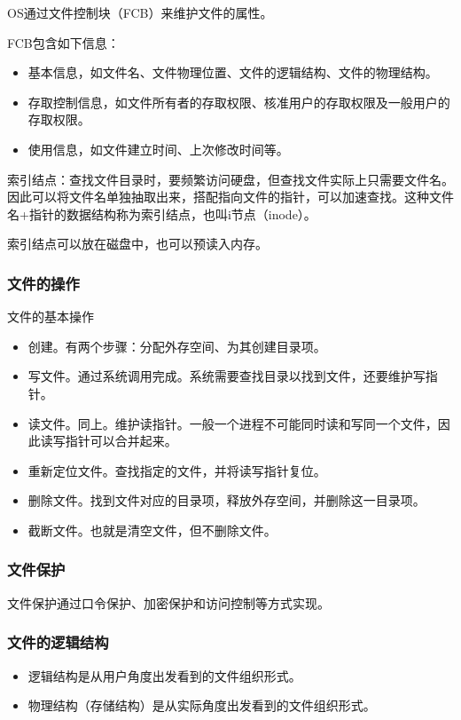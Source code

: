 \documentclass[12pt, a4paper, oneside]{ctexart}
\begin{document}
OS通过文件控制块（FCB）来维护文件的属性。

FCB包含如下信息：
\begin{itemize}
  \item 基本信息，如文件名、文件物理位置、文件的逻辑结构、文件的物理结构。
  \item 存取控制信息，如文件所有者的存取权限、核准用户的存取权限及一般用户的存取权限。
  \item 使用信息，如文件建立时间、上次修改时间等。
\end{itemize}

索引结点：查找文件目录时，要频繁访问硬盘，但查找文件实际上只需要文件名。因此可以将文件名单独抽取出来，搭配指向文件的指针，可以加速查找。这种文件名+指针的数据结构称为索引结点，也叫i节点（inode）。

索引结点可以放在磁盘中，也可以预读入内存。

\subsubsection{文件的操作}

文件的基本操作
\begin{itemize}
  \item 创建。有两个步骤：分配外存空间、为其创建目录项。
  \item 写文件。通过系统调用完成。系统需要查找目录以找到文件，还要维护写指针。
  \item 读文件。同上。维护读指针。一般一个进程不可能同时读和写同一个文件，因此读写指针可以合并起来。
  \item 重新定位文件。查找指定的文件，并将读写指针复位。
  \item 删除文件。找到文件对应的目录项，释放外存空间，并删除这一目录项。
  \item 截断文件。也就是清空文件，但不删除文件。
\end{itemize}

\subsubsection{文件保护}

文件保护通过口令保护、加密保护和访问控制等方式实现。

\subsubsection{文件的逻辑结构}

\begin{itemize}
  \item 逻辑结构是从用户角度出发看到的文件组织形式。
  \item 物理结构（存储结构）是从实际角度出发看到的文件组织形式。
\end{itemize}
\end{document}
